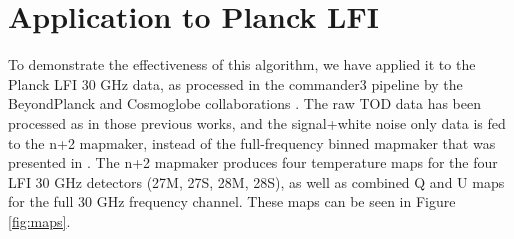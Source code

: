 \documentclass{aa}
\begin{document}






\section{Application to Planck LFI}

To demonstrate the effectiveness of this algorithm, we have applied it to the Planck LFI 30 GHz data, as processed in the commander3 pipeline by the BeyondPlanck and Cosmoglobe collaborations \citep{BP01, watts2023_dr1}. The raw TOD data has been processed as in those previous works, and the signal+white noise only data is fed to the n+2 mapmaker, instead of the full-frequency binned mapmaker that was presented in \citet{BP10}. The n+2 mapmaker produces four temperature maps for the four LFI 30 GHz detectors (27M, 27S, 28M, 28S), as well as combined Q and U maps for the full 30 GHz frequency channel. These maps can be seen in Figure \ref{fig:maps}.
\end{document}
